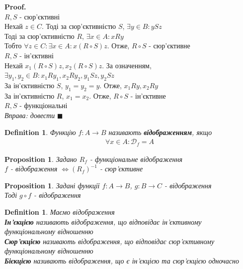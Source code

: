 \documentclass[a4paper, 14pt]{extarticle}
\theoremstyle{theoremdd}
\theoremstyle{theoremdd}
\newtheorem{definition}[theorem]{Definition}
\theoremstyle{theoremdd}
\theoremstyle{theoremdd}
\theoremstyle{theoremdd}
\newtheorem{proposition}[theorem]{Proposition}
\theoremstyle{theoremdd}
\theoremstyle{theoremdd}
\theoremstyle{theoremdd}
\newenvironment{pf}{\vspace*{-3mm} \textbf{Proof. \\}}{$\blacksquare$}
\begin{document}
\begin{pf}
$R,S$ - сюр'єктивні\\
Нехай $z \in C$. Тоді за сюр'єктивністю $S$, $\exists y \in B: ySz$\\
Тоді за сюр'єктивністю $R$, $\exists x \in A: xRy$\\
Тобто $\forall z \in C: \exists x \in A: x(R \circ S)z$. Отже, $R \circ S$ - сюр'єктивне
\bigskip \\
$R,S$ - ін'єктивні\\
Нехай $x_1(R \circ S)z, x_2(R \circ S)z$. За означенням,\\
$\exists y_1,y_2 \in B: x_1Ry_1, x_2Ry_2, y_1Sz, y_2Sz$\\
За ін'єктивністю $S$, $y_1 = y_2 = y$. Отже, $x_1Ry,x_2Ry$\\
За ін'єктивністю $R$, $x_1 = x_2$. Отже, $R \circ S$ - ін'єктивне
\bigskip \\
$R,S$ - функціональні\\
\textit{Вправа: довести}
\end{pf}

\begin{definition}
Функцію $f: A \to B$ називають \textbf{відображенням}, якщо
\begin{align*}
\forall x \in A: \mathcal{D}_f = A
\end{align*}
\end{definition}

\begin{proposition}
Задано $R_f$ - функціональне відображення\\
$f$ - відображення $\iff (R_f)^{-1}$ - сюр'єктивне
\end{proposition}

\begin{proposition}
Задані функції $f: A \to B$, $g: B \to C$ - відображення\\
Тоді $g \circ f$ - відображення
\end{proposition}

\begin{definition} Маємо відображення \\
\textbf{Ін'єкцією} називають відображення, що відповідає ін'єктивному \\ функціональному відношенню\\
\textbf{Сюр'єкцією} називають відображення, що відповідає сюр'єктивному \\ функціональному відношенню\\
\textbf{Бієкцією} називають відображення, що є ін'єкцією та сюр'єкцією одночасно\\
\end{definition}
\newpage
\end{document}
